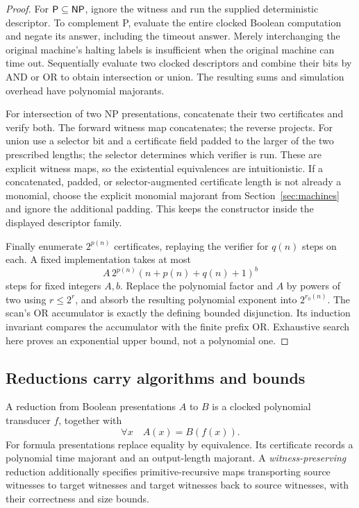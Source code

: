 \begin{proof}
For \(\mathsf P\subseteq\mathsf{NP}\), ignore the witness and run the supplied
deterministic descriptor. To complement P, evaluate the entire clocked
Boolean computation and negate its answer, including the timeout answer.
Merely interchanging the original machine's halting labels is insufficient
when the original machine can time out. Sequentially evaluate two clocked
descriptors and combine their bits by AND or OR to obtain intersection or
union. The resulting sums and simulation overhead have polynomial majorants.

For intersection of two NP presentations, concatenate their two
certificates and verify both. The forward witness map concatenates; the
reverse projects. For union use a selector bit and a certificate field
padded to the larger of the two prescribed lengths; the selector determines
which verifier is run. These are explicit witness maps, so the existential
equivalences are intuitionistic.
If a concatenated, padded, or selector-augmented certificate length is not
already a monomial, choose the explicit monomial majorant from
Section~\ref{sec:machines} and ignore the additional padding. This keeps the
constructor inside the displayed descriptor family.

Finally enumerate \(2^{p(n)}\) certificates, replaying the verifier for
\(q(n)\) steps on each. A fixed implementation takes at most
\[
 A\,2^{p(n)}(n+p(n)+q(n)+1)^b
\]
steps for fixed integers \(A,b\). Replace the polynomial factor and \(A\)
by powers of two using \(r\le2^r\), and absorb the resulting polynomial
exponent into \(2^{r_0(n)}\). The scan's OR accumulator is exactly the
defining bounded disjunction. Its induction invariant compares the
accumulator with the finite prefix OR. Exhaustive search here proves an
exponential upper bound, not a polynomial one.
\end{proof}

\subsection{Reductions carry algorithms and bounds}

\begin{definition}
A reduction from Boolean presentations \(A\) to \(B\) is a clocked
polynomial transducer \(f\), together with
\[
 \forall x\quad A(x)=B(f(x)).
\]
For formula presentations replace equality by equivalence. Its certificate
records a polynomial time majorant and an output-length majorant. A
\emph{witness-preserving} reduction additionally specifies primitive-recursive
maps transporting source witnesses to target witnesses and target witnesses
back to source witnesses, with their correctness and size bounds.
\end{definition}

